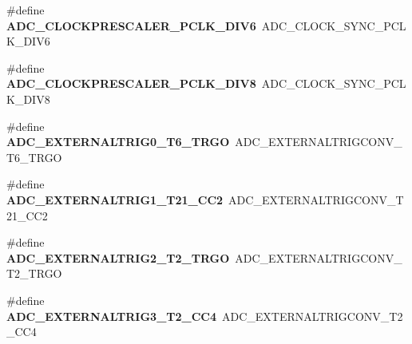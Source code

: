 \begin{DoxyCompactItemize}
\item 
\hypertarget{group___h_a_l___a_d_c___aliased___defines_gae5cbf680825b9ccaa02bdbab9217f550}{\#define {\bfseries A\-D\-C\-\_\-\-C\-L\-O\-C\-K\-P\-R\-E\-S\-C\-A\-L\-E\-R\-\_\-\-P\-C\-L\-K\-\_\-\-D\-I\-V6}~A\-D\-C\-\_\-\-C\-L\-O\-C\-K\-\_\-\-S\-Y\-N\-C\-\_\-\-P\-C\-L\-K\-\_\-\-D\-I\-V6}\label{group___h_a_l___a_d_c___aliased___defines_gae5cbf680825b9ccaa02bdbab9217f550}

\item 
\hypertarget{group___h_a_l___a_d_c___aliased___defines_ga93ccda8f421de00a2aa5b0b19b665393}{\#define {\bfseries A\-D\-C\-\_\-\-C\-L\-O\-C\-K\-P\-R\-E\-S\-C\-A\-L\-E\-R\-\_\-\-P\-C\-L\-K\-\_\-\-D\-I\-V8}~A\-D\-C\-\_\-\-C\-L\-O\-C\-K\-\_\-\-S\-Y\-N\-C\-\_\-\-P\-C\-L\-K\-\_\-\-D\-I\-V8}\label{group___h_a_l___a_d_c___aliased___defines_ga93ccda8f421de00a2aa5b0b19b665393}

\item 
\hypertarget{group___h_a_l___a_d_c___aliased___defines_ga72d7fcd1d65274786de2b3ccd6b853c4}{\#define {\bfseries A\-D\-C\-\_\-\-E\-X\-T\-E\-R\-N\-A\-L\-T\-R\-I\-G0\-\_\-\-T6\-\_\-\-T\-R\-G\-O}~A\-D\-C\-\_\-\-E\-X\-T\-E\-R\-N\-A\-L\-T\-R\-I\-G\-C\-O\-N\-V\-\_\-\-T6\-\_\-\-T\-R\-G\-O}\label{group___h_a_l___a_d_c___aliased___defines_ga72d7fcd1d65274786de2b3ccd6b853c4}

\item 
\hypertarget{group___h_a_l___a_d_c___aliased___defines_gab001be8f7abe45ddf92a476a65c6dd50}{\#define {\bfseries A\-D\-C\-\_\-\-E\-X\-T\-E\-R\-N\-A\-L\-T\-R\-I\-G1\-\_\-\-T21\-\_\-\-C\-C2}~A\-D\-C\-\_\-\-E\-X\-T\-E\-R\-N\-A\-L\-T\-R\-I\-G\-C\-O\-N\-V\-\_\-\-T21\-\_\-\-C\-C2}\label{group___h_a_l___a_d_c___aliased___defines_gab001be8f7abe45ddf92a476a65c6dd50}

\item 
\hypertarget{group___h_a_l___a_d_c___aliased___defines_gaad24eb6d74f2e4396d59afc4c715a053}{\#define {\bfseries A\-D\-C\-\_\-\-E\-X\-T\-E\-R\-N\-A\-L\-T\-R\-I\-G2\-\_\-\-T2\-\_\-\-T\-R\-G\-O}~A\-D\-C\-\_\-\-E\-X\-T\-E\-R\-N\-A\-L\-T\-R\-I\-G\-C\-O\-N\-V\-\_\-\-T2\-\_\-\-T\-R\-G\-O}\label{group___h_a_l___a_d_c___aliased___defines_gaad24eb6d74f2e4396d59afc4c715a053}

\item 
\hypertarget{group___h_a_l___a_d_c___aliased___defines_gaa0f8054b3363d13a190ee0d366363575}{\#define {\bfseries A\-D\-C\-\_\-\-E\-X\-T\-E\-R\-N\-A\-L\-T\-R\-I\-G3\-\_\-\-T2\-\_\-\-C\-C4}~A\-D\-C\-\_\-\-E\-X\-T\-E\-R\-N\-A\-L\-T\-R\-I\-G\-C\-O\-N\-V\-\_\-\-T2\-\_\-\-C\-C4}\label{group___h_a_l___a_d_c___aliased___defines_gaa0f8054b3363d13a190ee0d366363575}


\end{DoxyCompactItemize}
